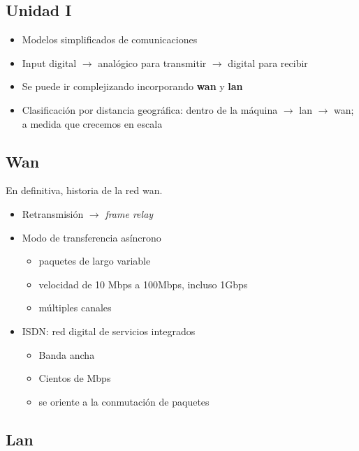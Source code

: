 \subsection{Unidad I}

\begin{itemize}
    \item Modelos simplificados de comunicaciones 
    \item Input digital \(\rightarrow\) analógico para transmitir \(\rightarrow\) digital para recibir
    \item Se puede ir complejizando incorporando \textbf{wan} y \textbf{lan}
    \item Clasificación por distancia geográfica: 
    dentro de la máquina \(\rightarrow\) lan \(\rightarrow\) wan;
    a medida que crecemos en escala 
\end{itemize}

\subsection{Wan}

En definitiva, historia de la red wan.

\begin{itemize}
    \item Retransmisión \(\rightarrow\) \textit{frame relay}
    \item Modo de transferencia asíncrono
    \begin{itemize}
        \item paquetes de largo variable
        \item velocidad de 10 Mbps a 100Mbps, incluso 1Gbps
        \item múltiples canales 
    \end{itemize}
    \item ISDN: red digital de servicios integrados
    \begin{itemize}
        \item Banda ancha
        \item Cientos de Mbps 
        \item se oriente a la conmutación de paquetes 
    \end{itemize}
\end{itemize}

\subsection{Lan}

